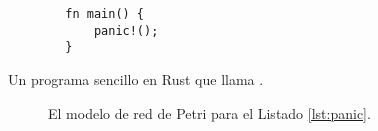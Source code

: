 \begin{listing}[!htb]
    \begin{verbatim}
        fn main() {
            panic!();
        }        
    \end{verbatim}
    \caption{Un programa sencillo en Rust que llama .}
    \label{lst:panic}
\end{listing}

\begin{figure}[!htb]
    \centering
    
    \caption{El modelo de red de Petri para el Listado \ref{lst:panic}.}
    \label{fig:panic}
\end{figure}